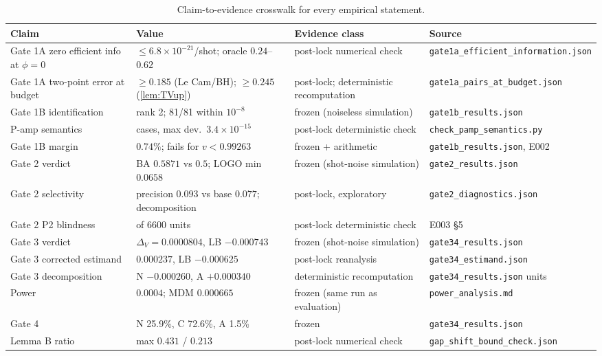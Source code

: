 \documentclass[10pt,twocolumn]{article}
\newcommand{\fn}[1]{{\small\nolinkurl{#1}}}
\theoremstyle{definition}
\theoremstyle{remark}
\newcommand{\DV}{\Delta_V}
\begin{document}
\begin{table}[h]
\centering\small
\caption{Claim-to-evidence crosswalk for every empirical statement.}\label{tab:claims}
\begin{tabularx}{\textwidth}{@{}>{\raggedright\arraybackslash}p{3.8cm}>{\raggedright\arraybackslash}X>{\raggedright\arraybackslash}p{3.4cm}>{\raggedright\arraybackslash}p{4.4cm}@{}}
\toprule
Claim & Value & Evidence class & Source \\
\midrule
Gate 1A zero efficient info at $\phi=0$ & $\le6.8\times10^{-21}$/shot; oracle $0.24$--$0.62$ & post-lock numerical check & \fn{gate1a_efficient_information.json} \\
Gate 1A two-point error at budget & $\ge0.185$ (Le Cam/BH); $\ge0.245$ (\cref{lem:TVup}) & post-lock; deterministic recomputation & \fn{gate1a_pairs_at_budget.json} \\
Gate 1B identification & rank 2; 81/81 within $10^{-8}$ & frozen (noiseless simulation) & \fn{gate1b_results.json} \\
P-amp semantics & 729 cases, max dev.\ $3.4\times10^{-15}$ & post-lock deterministic check & \fn{check_pamp_semantics.py} \\
Gate 1B margin & $0.74\%$; fails for $v<0.99263$ & frozen + arithmetic & \fn{gate1b_results.json}, E002 \\
Gate 2 verdict & BA $0.5871$ vs $0.5$; LOGO min $0.0658$ & frozen (shot-noise simulation) & \fn{gate2_results.json} \\
Gate 2 selectivity & precision $0.093$ vs base $0.077$; decomposition & post-lock, exploratory & \fn{gate2_diagnostics.json} \\
Gate 2 P2 blindness & 3300 of 6600 units & post-lock deterministic check & E003 §5 \\
Gate 3 verdict & $\DV=0.0000804$, LB $-0.000743$ & frozen (shot-noise simulation) & \fn{gate34_results.json} \\
Gate 3 corrected estimand & $0.000237$, LB $-0.000625$ & post-lock reanalysis & \fn{gate34_estimand.json} \\
Gate 3 decomposition & N $-0.000260$, A $+0.000340$ & deterministic recomputation & \fn{gate34_results.json} units \\
Power & $0.0004$; MDM $0.000665$ & frozen (same run as evaluation) & \fn{power_analysis.md} \\
Gate 4 & N 25.9\%, C 72.6\%, A 1.5\% & frozen & \fn{gate34_results.json} \\
Lemma B ratio & max $0.431$ / $0.213$ & post-lock numerical check & \fn{gap_shift_bound_check.json} \\

\end{tabularx}
\end{table}
\end{document}
